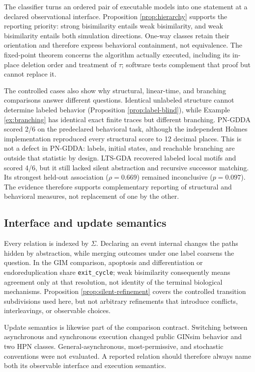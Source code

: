\documentclass{ws-jbcb}
\numberwithin{equation}{section}
\newcommand{\TAU}{\tau}
\begin{document}
The classifier turns an ordered pair of executable models into one statement at
a declared observational interface. Proposition \ref{prop:hierarchy} supports
the reporting priority: strong bisimilarity entails weak bisimilarity, and weak
bisimilarity entails both simulation directions. One-way classes retain their
orientation and therefore express behavioral containment, not equivalence. The
fixed-point theorem concerns the algorithm actually executed, including its
in-place deletion order and treatment of $\TAU$; software tests complement that
proof but cannot replace it.

The controlled cases also show why structural, linear-time, and branching
comparisons answer different questions. Identical unlabeled structure cannot
determine labeled behavior (Proposition \ref{prop:label-blind}), while Example
\ref{ex:branching} has identical exact finite traces but different branching.
PN-GDDA scored 2/6 on the predeclared behavioral task, although the independent
Holmes implementation reproduced every structural score to 12 decimal places.
This is not a defect in PN-GDDA: labels, initial states, and reachable branching
are outside that statistic by design. LTS-GDA recovered labeled local motifs and
scored 4/6, but it still lacked silent abstraction and recursive successor
matching. Its strongest held-out association ($\rho=0.669$) remained
inconclusive ($p=0.097$). The evidence therefore supports complementary reporting
of structural and behavioral measures, not replacement of one by the other.

\subsection{Interface and update semantics}
\label{sec:discussion-interface}

Every relation is indexed by $\Sigma$. Declaring an event internal changes the
paths hidden by abstraction, while merging outcomes under one label coarsens the
question. In the GIM comparison, apoptosis and differentiation or
endoreduplication share \texttt{exit\_cycle}; weak bisimilarity consequently
means agreement only at that resolution, not identity of the terminal biological
mechanisms. Proposition \ref{prop:silent-refinement} covers the controlled
transition subdivisions used here, but not arbitrary refinements that introduce
conflicts, interleavings, or observable choices.

Update semantics is likewise part of the comparison contract. Switching between
asynchronous and synchronous execution changed public GINsim behavior and two HPN
classes. General-asynchronous, most-permissive, and stochastic conventions were
not evaluated.\cite{Pauleve2020} A reported relation should therefore always name
both its observable interface and execution semantics.
\end{document}
